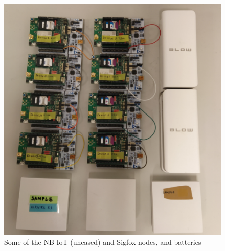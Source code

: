 \documentclass[12pt]{article}
\begin{document}

\begin{figure}[h]
    \centering
    \includegraphics[trim=1cm 0cm 2cm 1cm,clip=true,width=0.9\columnwidth,totalheight=7.5cm ,width=0.9\columnwidth,keepaspectratio]{Images/experimentSetup.pdf}
    \caption{Some of the  NB-IoT (uncased) and Sigfox nodes, and batteries}
    \label{fig:Experimental Setup}
\end{figure}
\end{document}
